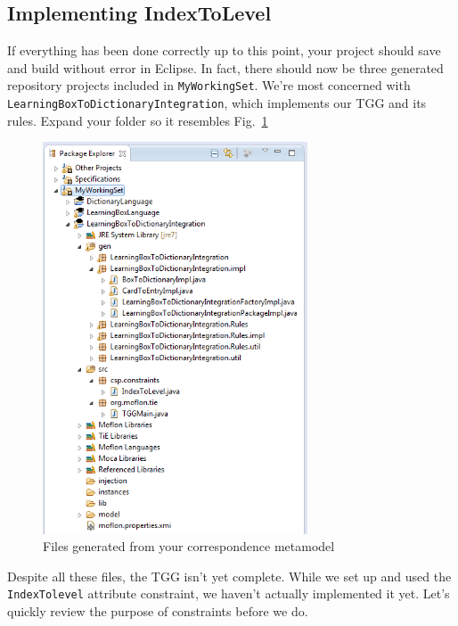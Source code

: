 \newpage
\hypertarget{subsec:IndexToLevel}{}
\subsection{Implementing IndexToLevel}
\genHeader

If everything has been done correctly up to this point, your project should save and build without error in Eclipse. In fact, there should now be three
generated repository projects included in \texttt{MyWorkingSet}. We're most concerned with \texttt{LearningBox\-To\-Dictionary\-Integration}, which implements
our TGG and its rules. Expand your folder so it resembles Fig.~\ref{eclipse:tggGenerated}


\begin{figure}[htbp]
\begin{center}
  \includegraphics[width=0.7\textwidth]{eclipse_generatedTGG}
  \caption{Files generated from your correspondence metamodel}
  \label{eclipse:tggGenerated}
\end{center}
\end{figure}

Despite all these files, the TGG isn't yet complete. While we set up and used the \texttt{IndexTolevel} attribute constraint, we haven't actually
implemented it yet. Let's quickly review the purpose of constraints before we do.

